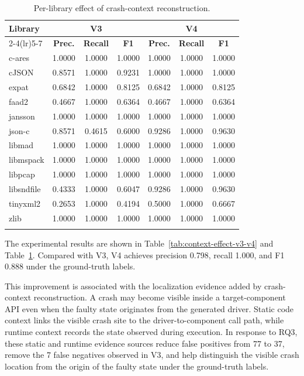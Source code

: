 \documentclass[pdflatex,sn-basic]{sn-jnl}%
\renewcommand{\arraystretch}{1.16}%
\theoremstyle{thmstyleone}%
\theoremstyle{thmstyletwo}%
\theoremstyle{thmstylethree}%
\begin{document}
\begin{table}[ht]
\caption{Per-library effect of crash-context reconstruction.}
\label{tab:per-library-context-reconstruction}
\centering
\scriptsize
\setlength{\tabcolsep}{2.2pt}
\renewcommand{\arraystretch}{1.08}
\begin{tabular*}{\linewidth}{@{\extracolsep{\fill}}lcccccc}
\toprule
\textbf{Library} & \multicolumn{3}{c}{\textbf{V3}} & \multicolumn{3}{c}{\textbf{V4}} \\
\cmidrule(lr){2-4}\cmidrule(lr){5-7}
& \textbf{Prec.} & \textbf{Recall} & \textbf{F1} & \textbf{Prec.} & \textbf{Recall} & \textbf{F1} \\
\midrule
c-ares & 1.0000 & 1.0000 & 1.0000 & 1.0000 & 1.0000 & 1.0000 \\
cJSON & 0.8571 & 1.0000 & 0.9231 & 1.0000 & 1.0000 & 1.0000 \\
expat & 0.6842 & 1.0000 & 0.8125 & 0.6842 & 1.0000 & 0.8125 \\
faad2 & 0.4667 & 1.0000 & 0.6364 & 0.4667 & 1.0000 & 0.6364 \\
jansson & 1.0000 & 1.0000 & 1.0000 & 1.0000 & 1.0000 & 1.0000 \\
json-c & 0.8571 & 0.4615 & 0.6000 & 0.9286 & 1.0000 & 0.9630 \\
libmad & 1.0000 & 1.0000 & 1.0000 & 1.0000 & 1.0000 & 1.0000 \\
libmspack & 1.0000 & 1.0000 & 1.0000 & 1.0000 & 1.0000 & 1.0000 \\
libpcap & 1.0000 & 1.0000 & 1.0000 & 1.0000 & 1.0000 & 1.0000 \\
libsndfile & 0.4333 & 1.0000 & 0.6047 & 0.9286 & 1.0000 & 0.9630 \\
tinyxml2 & 0.2653 & 1.0000 & 0.4194 & 0.5000 & 1.0000 & 0.6667 \\
zlib & 1.0000 & 1.0000 & 1.0000 & 1.0000 & 1.0000 & 1.0000 \\
\botrule
\end{tabular*}
\end{table}

The experimental results are shown in Table~\ref{tab:context-effect-v3-v4} and Table~\ref{tab:per-library-context-reconstruction}. Compared with V3, V4 achieves precision 0.798, recall 1.000, and F1 0.888 under the ground-truth labels.

This improvement is associated with the localization evidence added by crash-context reconstruction. A crash may become visible inside a target-component API even when the faulty state originates from the generated driver. Static code context links the visible crash site to the driver-to-component call path, while runtime context records the state observed during execution. In response to RQ3, these static and runtime evidence sources reduce false positives from 77 to 37, remove the 7 false negatives observed in V3, and help distinguish the visible crash location from the origin of the faulty state under the ground-truth labels.
\end{document}
